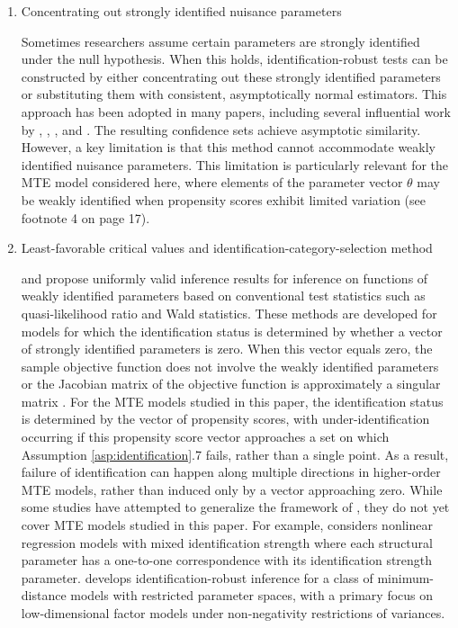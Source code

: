 \documentclass[11pt]{article}
\theoremstyle{definition}
\newcommand{\0}{\ensuremath{\mathbf{0}}}
\begin{document}
\begin{bibunit}
\begin{enumerate}
\item Concentrating out strongly identified nuisance parameters \par
Sometimes researchers assume certain parameters are strongly identified under the null hypothesis. When this holds, identification-robust tests can be constructed by either concentrating out these strongly identified parameters or substituting them with consistent, asymptotically normal estimators. This approach has been adopted in many papers, including several influential work by \cite{stock/wright:2000}, \cite{kleibergen:2005}, \cite{andrews/mikusheva:2016b}, and \cite{andrews/guggenberger:2019}. The resulting confidence sets achieve asymptotic similarity. However, a key limitation is that this method cannot accommodate weakly identified nuisance parameters. This limitation is particularly relevant for the MTE model considered here, where elements of the parameter vector $\theta$ may be weakly identified when propensity scores exhibit limited variation (see footnote 4 on page 17).

\item Least-favorable critical values and identification-category-selection method \par
\citet{andrews/cheng:2012,andrews/cheng:2013,andrews/cheng:2014} and \citet{han/mccloskey:2019} propose uniformly valid inference results for inference on functions of weakly identified parameters based on conventional test statistics such as quasi-likelihood ratio and Wald statistics. These methods are developed for models for which the identification status is determined by whether a vector of strongly identified parameters is zero. When this vector equals zero, the sample objective function does not involve the weakly identified parameters \citep[Assumption A]{andrews/cheng:2012} or the Jacobian matrix of the objective function is approximately a singular matrix \citep[Assumption ID]{han/mccloskey:2019}. For the MTE models studied in this paper, the identification status is determined by the vector of propensity scores, with under-identification occurring if this propensity score vector approaches a set on which Assumption \ref{asp:identification}.7 fails, rather than a single point. As a result, failure of identification can happen along multiple directions in higher-order MTE models, rather than induced only by a vector approaching zero. 
While some studies have attempted to generalize the framework of \cite{andrews/cheng:2012}, they do not yet cover MTE models studied in this paper. For example, \cite{cheng:2015} considers nonlinear regression models with mixed identification strength where each structural parameter has a one-to-one correspondence with its identification strength parameter. \cite{cox:2025} develops identification-robust inference for a class of minimum-distance models with restricted parameter spaces, with a primary focus on low-dimensional factor models under non-negativity restrictions of variances. 


\end{enumerate}
\end{bibunit}
\end{document}
